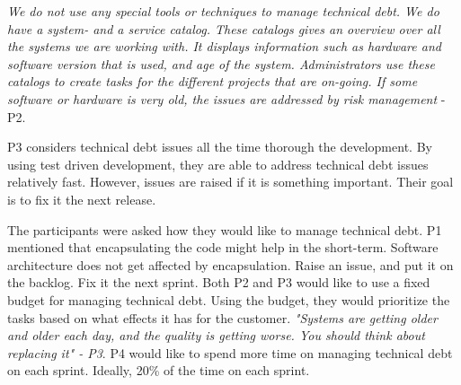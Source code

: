\begin{displayquote}
	\textit{We do not use any special tools or techniques to manage technical debt. We do have a system- and a service catalog. These catalogs gives an overview over all the systems we are working with. It displays information such as hardware and software version that is used, and age of the system. Administrators use these catalogs to create tasks for the different projects that are on-going. If some software or hardware is very old, the issues are addressed by risk management} - P2.
\end{displayquote}

P3 considers technical debt issues all the time thorough the development. By using test driven development, they are able to address technical debt issues relatively fast. However, issues are raised if it is something important. Their goal is to fix it the next release.  

The participants were asked how they would like to manage technical debt. P1 mentioned that encapsulating the code might help in the short-term. Software architecture does not get affected by encapsulation. Raise an issue, and put it on the backlog. Fix it the next sprint. Both P2 and P3 would like to use a fixed budget for managing technical debt. Using the budget, they would prioritize the tasks based on what effects it has for the customer. \textit{"Systems are getting older and older each day, and the quality is getting worse. You should think about replacing it" - P3}. P4 would like to spend more time on managing technical debt on each sprint. Ideally, 20\% of the time on each sprint.


